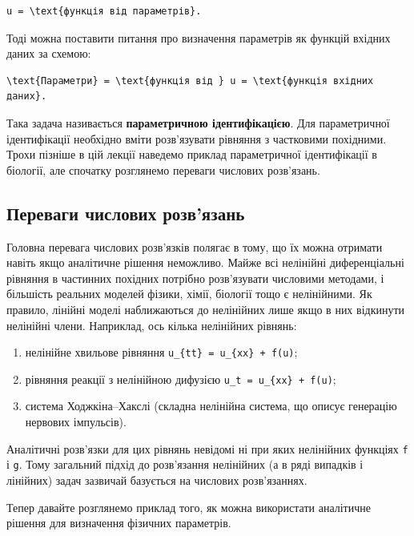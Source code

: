 \documentclass[
  ukrainian,
]{article}
\providecommand{\tightlist}{%
  \setlength{\itemsep}{0pt}\setlength{\parskip}{0pt}}
\begin{document}
\begin{verbatim}
u = \text{функція від параметрів}.
\end{verbatim}

Тоді можна поставити питання про визначення параметрів як функцій
вхідних даних за схемою:

\begin{verbatim}
\text{Параметри} = \text{функція від } u = \text{функція вхідних даних}.
\end{verbatim}

Така задача називається \textbf{параметричною ідентифікацією}. Для
параметричної ідентифікації необхідно вміти розв'язувати рівняння з
частковими похідними. Трохи пізніше в цій лекції наведемо приклад
параметричної ідентифікації в біології, але спочатку розглянемо переваги
числових розв'язань.

\subsection{Переваги числових
розв'язань}\label{ux43fux435ux440ux435ux432ux430ux433ux438-ux447ux438ux441ux43bux43eux432ux438ux445-ux440ux43eux437ux432ux44fux437ux430ux43dux44c}

Головна перевага числових розв'язків полягає в тому, що їх можна
отримати навіть якщо аналітичне рішення неможливо. Майже всі нелінійні
диференціальні рівняння в частинних похідних потрібно розв'язувати
числовими методами, і більшість реальних моделей фізики, хімії, біології
тощо є нелінійними. Як правило, лінійні моделі наближаються до
нелінійних лише якщо в них відкинути нелінійні члени. Наприклад, ось
кілька нелінійних рівнянь:

\begin{enumerate}
\def\labelenumi{\arabic{enumi}.}
\tightlist
\item
  нелінійне хвильове рівняння \texttt{u\_\{tt\}\ =\ u\_\{xx\}\ +\ f(u)};
\item
  рівняння реакції з нелінійною дифузією
  \texttt{u\_t\ =\ u\_\{xx\}\ +\ f(u)};
\item
  система Ходжкіна--Хакслі (складна нелінійна система, що описує
  генерацію нервових імпульсів).
\end{enumerate}

Аналітичні розв'язки для цих рівнянь невідомі ні при яких нелінійних
функціях \texttt{f} і \texttt{g}. Тому загальний підхід до розв'язання
нелінійних (а в ряді випадків і лінійних) задач зазвичай базується на
числових розв'язаннях.

Тепер давайте розглянемо приклад того, як можна використати аналітичне
рішення для визначення фізичних параметрів.
\end{document}
